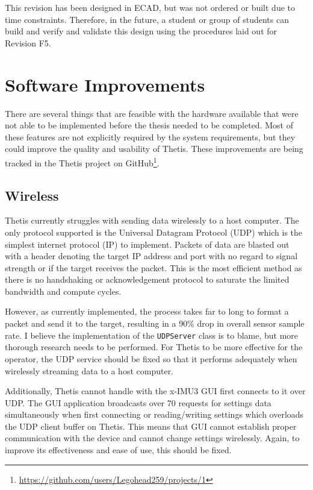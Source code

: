 This revision has been designed in ECAD, but was not ordered or built due to time constraints.
Therefore, in the future, a student or group of students can build and verify and validate this design using the procedures laid out for Revision F5.


\section{Software Improvements} 
There are several things that are feasible with the hardware available that were not able to be implemented before the thesis needed to be completed.
Most of these features are not explicitly required by the system requirements, but they could improve the quality and usability of Thetis.
These improvements are being tracked in the Thetis project on GitHub\footnote{\url{https://github.com/users/Legohead259/projects/1}}.

\subsection{Wireless} 
Thetis currently struggles with sending data wirelessly to a host computer.
The only protocol supported is the Universal Datagram Protocol (UDP) which is the simplest internet protocol (IP) to implement.
Packets of data are blasted out with a header denoting the target IP address and port with no regard to signal strength or if the target receives the packet.
This is the most efficient method as there is no handshaking or acknowledgement protocol to saturate the limited bandwidth and compute cycles.

However, as currently implemented, the process takes far to long to format a packet and send it to the target, resulting in a 90\% drop in overall sensor sample rate.
I believe the implementation of the \lstinline[style=customInline]|UDPServer| class is to blame, but more thorough research needs to be performed.
For Thetis to be more effective for the operator, the UDP service should be fixed so that it performs adequately when wirelessly streaming data to a host computer.

Additionally, Thetis cannot handle with the x-IMU3 GUI first connects to it over UDP.
The GUI application broadcasts over 70 requests for settings data simultaneously when first connecting or reading/writing settings which overloads the UDP client buffer on Thetis.
This means that GUI cannot establish proper communication with the device and cannot change settings wirelessly.
Again, to improve its effectiveness and ease of use, this should be fixed.

